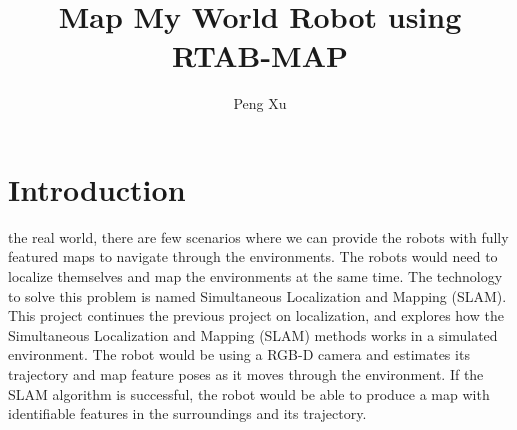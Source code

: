 \documentclass[10pt,journal,compsoc]{IEEEtran}
\begin{document}
\title{Map My World Robot using RTAB-MAP}

\author{Peng Xu}

%
{}


\maketitle
\IEEEdisplaynontitleabstractindextext
\IEEEpeerreviewmaketitle
\section{Introduction}
\label{sec:introduction}

 the real world, there are few scenarios where we can provide the robots with fully featured maps to navigate through the environments. The robots would need to localize themselves and map the environments at the same time. The technology to solve this problem is named Simultaneous Localization and Mapping (SLAM). This project continues the previous project on localization, and explores how the Simultaneous Localization and Mapping (SLAM) methods works in a simulated environment. The robot would be using a RGB-D camera and estimates its trajectory and map feature poses as it moves through the environment. If the SLAM algorithm is successful, the robot would be able to produce a map with identifiable features in the surroundings and its trajectory.
\end{document}
